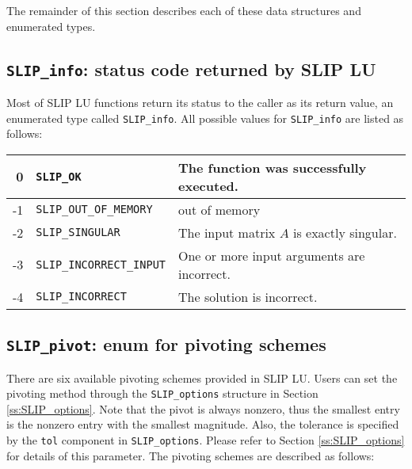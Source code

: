 \documentclass[12pt]{article}
\theoremstyle{definition}
\begin{document}
The remainder of this section describes each of these data structures and
enumerated types.

\cprotect\subsection{\verb|SLIP_info|: status code returned by SLIP LU}
\label{ss:SLIP_info}

Most of SLIP LU functions return its status to the caller as its return value,
an enumerated type called \verb|SLIP_info|. All possible values for
\verb|SLIP_info| are listed as follows:

\begin{center}
\begin{tabular}{rll}
\hline
    0& \verb|SLIP_OK|& The function was successfully executed.\\
\hline
    -1& \verb|SLIP_OUT_OF_MEMORY|& out of memory\\
\hline
    -2& \verb|SLIP_SINGULAR|& The input matrix $A$ is exactly singular.\\
\hline
    -3& \verb|SLIP_INCORRECT_INPUT|& One or more input arguments are incorrect.\\
\hline
    -4& \verb|SLIP_INCORRECT|& The solution is incorrect.\\
\hline
\end{tabular}
\end{center}

\cprotect\subsection{\verb|SLIP_pivot|: enum for pivoting schemes}
\label{ss:SLIP_pivot}

There are six available pivoting schemes provided in SLIP LU.  Users can set
the pivoting method through the \verb|SLIP_options| structure in Section
\ref{ss:SLIP_options}. Note that the pivot is always nonzero, thus the smallest
entry is the nonzero entry with the smallest magnitude.  Also, the tolerance is
specified by the \verb|tol| component in \verb|SLIP_options|.  Please refer to
Section \ref{ss:SLIP_options} for details of this parameter. The pivoting
schemes are described as follows:
\end{document}
